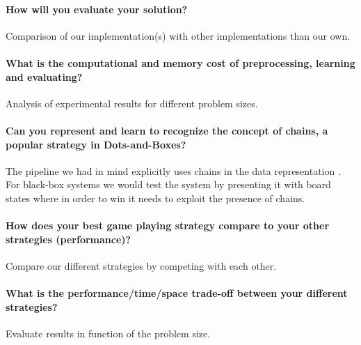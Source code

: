 \documentclass[11pt,a4paper]{article}
\begin{document}
	\paragraph{How will you evaluate your solution?} Comparison of our implementation(s) with other implementations than our own.
	\paragraph{What is the computational and memory cost of preprocessing, learning and evaluating?} Analysis of experimental results for different problem sizes.
	\paragraph{Can you represent and learn to recognize the concept of chains, a popular strategy in Dots-and-Boxes?} The pipeline we had in mind explicitly uses chains in the data representation \cite{7317912}. For black-box systems we would test the system by presenting it with board states where in order to win it needs to exploit the presence of chains.
	\paragraph{How does your best game playing strategy compare to your other strategies (performance)?} Compare our different strategies by competing with each other.
	\paragraph{What is the performance/time/space trade-off between your different strategies?} Evaluate results in function of the problem size.
	
	
	
	
	
\end{document}
